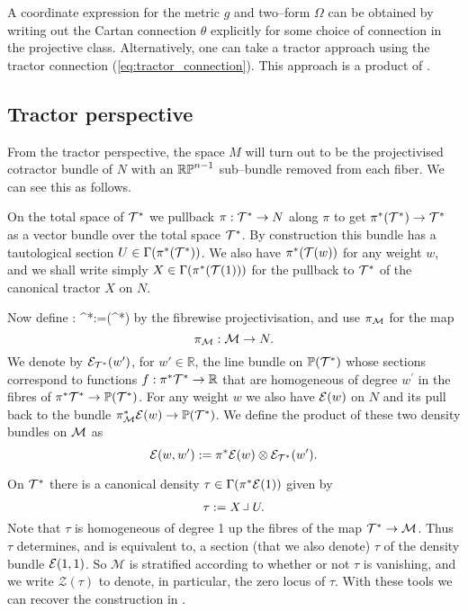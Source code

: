A coordinate expression for the metric $g$ and two--form $\Omega$ can be obtained by writing out the Cartan connection $\theta$ explicitly for some choice of connection in the projective class. Alternatively, one can take a tractor approach using the tractor connection (\ref{eq:tractor_connection}). This approach is a product of \cite{DGW}.

\subsection{Tractor perspective} \label{sec:trac_construction}

From the tractor perspective, the space $M$ will turn out to be the projectivised cotractor bundle of $N$ with an $\mathbb{RP}^{n-1}$ sub--bundle removed from each fiber. We can see this as follows.

On the total space of $\mathcal{T}^*$ we pullback $\pi:\mathcal{T}^*\to N$ along $\pi$ to get $\pi^*(\mathcal{T}^*)\to \mathcal{T}^*$ as a vector bundle over the total space $\mathcal{T}^*$. By construction this bundle has a tautological section $U\in \Gamma (\pi^*(\mathcal{T}^*))$.  We also have $\pi^*(\mathcal{T}(w))$ for any weight $w$, and we shall write simply $X\in \Gamma(\pi^*(\mathcal{T}(1)))$ for the pullback to $\mathcal{T}^*$ of the canonical tractor $X$ on $N$.

Now define
\be
\label{projection_map}
\kappa: \cT^*\longrightarrow {}:=(\cT^*)
\ee
by the fibrewise projectivisation, and use $\pi_{\mathcal{M}}$ for the map
$$
\pi_{\mathcal{M}}:\mathcal{M}\to N.
$$
We denote by $\mathcal{E}_{\mathcal{T}^*}(w')$, for $w'\in \mathbb{R}$, the line
bundle on $\mathbb{P}(\mathcal{T}^*)$ whose sections correspond to functions
$f: \pi^*\mathcal{T}^* \to\mathbb{R} $ that are homogeneous of degree $w^\prime$ in
the fibres of $\pi^*\mathcal{T}^*\to \mathbb{P}(\mathcal{T}^*)$. For any weight $w$ we also have $\mathcal{E}(w)$ on $N$ and its pull back to the bundle $\pi_{\mathcal{M}}^*\mathcal{E}(w)\to \mathbb{P}(\mathcal{T}^*)$.
We define the product of these two density bundles on $\mathcal{M}$ as
$$
\mathcal{E}(w,w'):= \pi^*\mathcal{E}(w) \otimes \mathcal{E}_{\mathcal{T}^*}(w').
$$

On $\mathcal{T}^*$ there is  a canonical density $\tau\in \Gamma(\pi^*\mathcal{E}(1))$ given by
$$
\tau:= X\hook U .
$$
Note that $\tau$ is homogeneous of degree 1 up the fibres of the
map $\mathcal{T}^*\to \mathcal{M}$. Thus $\tau$ determines, and is equivalent
to, a section (that we also denote) $\tau$ of the density bundle $\mathcal{E}(1,1)$. So $\mathcal{M}$ is stratified according to
whether or not $\tau$ is vanishing, and we write $\mathcal{Z}(\tau)$
to denote, in particular, the zero locus of $\tau$. With these tools we can recover the construction in \cite{DM}.

